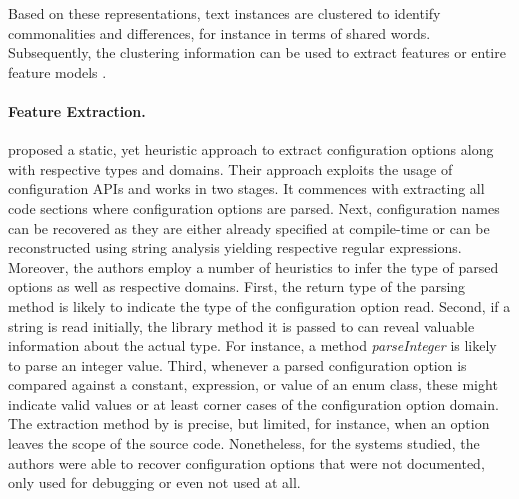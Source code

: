 Based on these representations, text instances are clustered to identify
commonalities and differences, for instance in terms of shared words.
Subsequently, the clustering information can be used to extract features or entire feature
models \citep{alves_exploratory_2008,bakar_feature_2015}.


\paragraph{Feature Extraction.} \cite{rabkin_static_2011} proposed a static, yet
heuristic approach to extract configuration options along with respective types and domains. Their approach
exploits the usage of configuration APIs and works
in two stages. It commences with extracting all code sections where
configuration options are parsed. Next, configuration names can be
recovered as they are either already specified at compile-time or can be
reconstructed using string analysis yielding respective regular expressions.
Moreover, the authors employ a number of heuristics to infer the type of parsed
options as well as respective domains. First, the return type of the
parsing method is likely to indicate the type of the configuration option read.
Second, if a string is read initially, the library method it is passed to can
reveal valuable information about the actual type. For instance, a method
\emph{parseInteger} is likely to parse an integer value. Third, whenever a
parsed configuration option is compared against a constant, expression, or value
of an enum class, these might indicate valid values or at least corner cases of
the configuration option domain. The extraction method by
\cite{rabkin_static_2011} is precise, but limited, for instance, when an
option leaves the scope of the source code.
Nonetheless, for the systems studied, the authors were able to recover
configuration options that were not documented, only used for debugging or even not used at
all.

